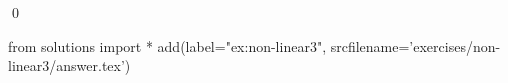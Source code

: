 
\begin{ex} 
  \label{ex:non-linear3}
  
  \qed
\end{ex} 
\begin{python0}
from solutions import *
add(label="ex:non-linear3",
    srcfilename='exercises/non-linear3/answer.tex') 
\end{python0}
